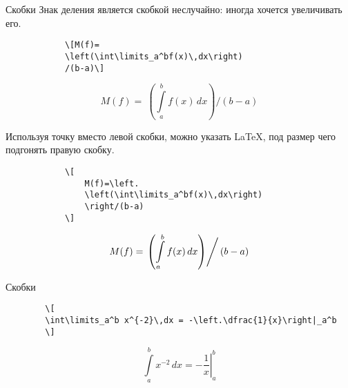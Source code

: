 \begin{frame}[fragile]{Скобки}
	Знак деления является скобкой неслучайно: иногда хочется увеличивать его.
	
	\begin{minipage}{0.54\textwidth}
		\begin{verbatim}
			\[M(f)=
			\left(\int\limits_a^bf(x)\,dx\right)
			/(b-a)\]
		\end{verbatim}
	\end{minipage}
	\begin{minipage}{0.44\textwidth}
		\[
		M(f)=\
		\left(\int\limits_a^bf(x)\,dx\right)
		/(b-a)
		\]
	\end{minipage}

	Используя точку вместо левой скобки, можно указать \LaTeX{}, под размер чего подгонять правую скобку.
	
	\begin{minipage}{0.54\textwidth}
		\begin{verbatim}
			\[
				M(f)=\left.
				\left(\int\limits_a^bf(x)\,dx\right)
				\right/(b-a)
			\]
		\end{verbatim}
	\end{minipage}
	\begin{minipage}{0.44\textwidth}
		\[
		M(f)=\left.
		\left(\int\limits_a^bf(x)\,dx\right)
		\right/(b-a)
		\]
	\end{minipage}
	
\end{frame}

\begin{frame}[fragile]{Скобки}
	
	\large
	\begin{verbatim}
		\[
		\int\limits_a^b x^{-2}\,dx = -\left.\dfrac{1}{x}\right|_a^b
		\]
	\end{verbatim}
	\Large
	\[
		\int\limits_a^b x^{-2}\,dx = -\left.\dfrac{1}{x}\right|_a^b
	\]
	

	
\end{frame}



